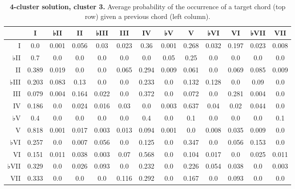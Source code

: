 \begin{table}[htbp]
\begin{minipage}{\linewidth}
\setlength{\tymax}{0.5\linewidth}
\centering
\small
\caption{\textbf{4-cluster solution, cluster 3.} Average probability of the occurrence of a target chord (top row) given a previous chord (left column).}
\label{4-clustersolutioncluster3.averageprobabilityoftheoccurrenceofatargetchordtoprowgivenapreviouschordleftcolumn.}
\begin{tabulary}{\textwidth}{@{}RCCCCCCCCCCCC@{}} \toprule
&I&♭II&II&♭III&III&IV&♭V&V&♭VI&VI&♭VII&VII\\
\midrule
I&0.0&0.001&0.056&0.03&0.023&0.36&0.001&0.268&0.032&0.197&0.023&0.008\\
♭II&0.7&0.0&0.0&0.0&0.0&0.0&0.05&0.25&0.0&0.0&0.0&0.0\\
II&0.389&0.019&0.0&0.0&0.065&0.294&0.009&0.061&0.0&0.069&0.085&0.009\\
♭III&0.203&0.083&0.13&0.0&0.0&0.233&0.0&0.132&0.128&0.0&0.09&0.0\\
III&0.079&0.004&0.164&0.022&0.0&0.372&0.0&0.072&0.0&0.281&0.004&0.0\\
IV&0.186&0.0&0.024&0.016&0.03&0.0&0.003&0.637&0.04&0.02&0.044&0.0\\
♭V&0.4&0.0&0.0&0.0&0.0&0.4&0.0&0.1&0.0&0.0&0.0&0.1\\
V&0.818&0.001&0.017&0.003&0.013&0.094&0.001&0.0&0.008&0.035&0.009&0.0\\
♭VI&0.257&0.0&0.007&0.056&0.0&0.125&0.0&0.347&0.0&0.056&0.153&0.0\\
VI&0.151&0.011&0.038&0.003&0.07&0.568&0.0&0.104&0.017&0.0&0.025&0.011\\
♭VII&0.329&0.0&0.026&0.093&0.0&0.232&0.0&0.226&0.054&0.038&0.0&0.003\\
VII&0.333&0.0&0.0&0.0&0.116&0.292&0.0&0.167&0.0&0.093&0.0&0.0\\

\bottomrule

\end{tabulary}
\end{minipage}
\end{table}

